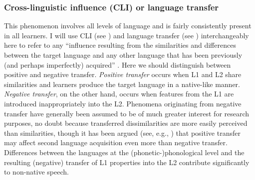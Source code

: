 \subsubsection{Cross-linguistic influence (CLI) or language transfer} 
This phenomenon involves all levels of language and is fairly consistently present in all learners. I will use CLI (see \citealt{SharwoodSmithKellerman1986}) and language transfer (see \citealt{Weinreich1953}) interchangeably here to refer to any “influence resulting from the similarities and differences between the target language and any other language that has been previously (and perhaps imperfectly) acquired” \citep[27]{Odlin1989}. Here we should distinguish between positive and negative transfer. \textit{Positive transfer} occurs when L1 and L2 share similarities and learners produce the target language in a native-like manner. \textit{Negative transfer}, on the other hand, occurs when features from the L1 are introduced inappropriately into the L2. Phenomena originating from negative transfer have generally been assumed to be of much greater interest for research purposes, no doubt because transferred dissimilarities are more easily perceived than similarities, though it has been argued (see, e.g., \citealt{Ringbom1987,Ringbom1992}) that positive transfer may affect second language acquisition even more than negative transfer. Differences between the languages at the (phonetic-)phonological level and the resulting (negative) transfer of L1 properties into the L2 contribute significantly to non-native speech.



